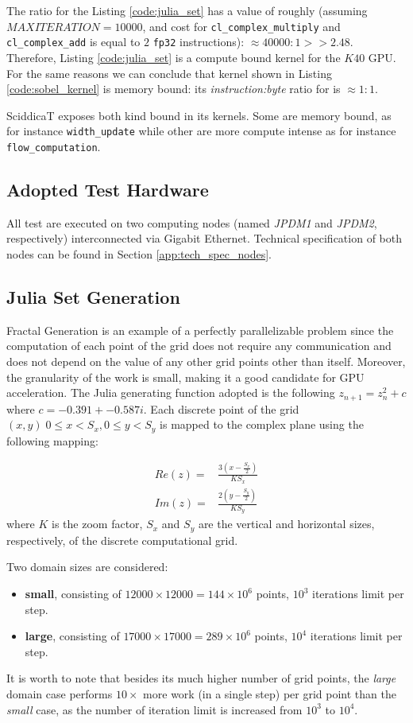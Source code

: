 The ratio for the Listing \ref{code:julia_set} has a value of roughly (assuming $MAXITERATION=10000$, and cost for \texttt{cl\_complex\_multiply} and \texttt{cl\_complex\_add} is equal to $2$ \texttt{fp32} instructions): $\approx 40000:1 >> 2.48$. Therefore, Listing \ref{code:julia_set} is a compute bound kernel for the $K40$ GPU.
For the same reasons we can conclude that kernel shown in Listing  \ref{code:sobel_kernel} is memory bound: its \textit{instruction:byte} ratio for is $\approx 1:1$.

SciddicaT  exposes both kind bound in its kernels. Some are memory bound, as for instance \texttt{width_update} while other are more compute intense as for instance \texttt{flow_computation}. 

\subsection{Adopted Test Hardware}
All test are executed on two computing nodes (named \textit{JPDM1} and \textit{JPDM2}, respectively) interconnected via Gigabit Ethernet.
Technical specification of both nodes can be found in Section \ref{app:tech_spec_nodes}.


\subsection{Julia Set Generation}

Fractal Generation is an example of a perfectly parallelizable problem since the computation of each point of the grid does not require any communication and does not depend on the value of any other grid points other than itself. Moreover, the granularity of the work is small, making it a good candidate for GPU acceleration.
The Julia generating function adopted is the following $z_{n+1} = z^2_n + c$ where $c=-0.391+-0.587i$. Each discrete point of the grid $(x,y)\; 0\leq x < S_x, 0\leq y < S_y$ is mapped to the complex plane using the following mapping:

\begin{align*}
    Re(z)=&\frac{3(x-\frac{S_x}{2})}{K S_x} \\
    Im(z)=&\frac{2(y-\frac{S_y}{2})}{K S_y}
\end{align*}
where $K$ is the zoom factor, $S_x$ and $S_y$ are the vertical and horizontal sizes, respectively, of the discrete computational grid.

Two domain sizes are considered:
    \begin{itemize}
        \item \textbf{small}, consisting of  $12000 \times 12000 = 144 \times 10^6$ points, $10^3$ iterations limit per step.
        \item \textbf{large}, consisting of $17000 \times 17000 = 289 \times 10^6$ points, $10^4$ iterations limit per step.
    \end{itemize}
It is worth to note that besides its much higher number of grid points, the \textit{large} domain case performs $10 \times$ more work (in a single step) per grid point than the \textit{small} case, as the number of iteration limit is increased from $10^3$ to $10^4$.


